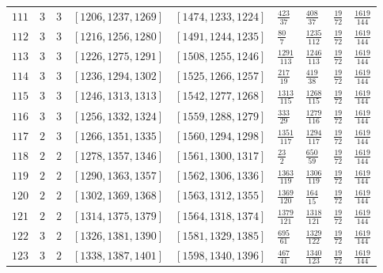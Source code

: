 \documentclass[12pt]{extarticle}
\begin{document}
\begin{longtable}{lllllllll}
$111$ & $3$ & $3$ & $\left[1206, 1237, 1269\right]$ & $\left[1474, 1233, 1224\right]$ & $\frac{423}{37}$ & $\frac{408}{37}$ & $\frac{19}{72}$ & $\frac{1619}{144}$ \\
$112$ & $3$ & $3$ & $\left[1216, 1256, 1280\right]$ & $\left[1491, 1244, 1235\right]$ & $\frac{80}{7}$ & $\frac{1235}{112}$ & $\frac{19}{72}$ & $\frac{1619}{144}$ \\
$113$ & $3$ & $3$ & $\left[1226, 1275, 1291\right]$ & $\left[1508, 1255, 1246\right]$ & $\frac{1291}{113}$ & $\frac{1246}{113}$ & $\frac{19}{72}$ & $\frac{1619}{144}$ \\
$114$ & $3$ & $3$ & $\left[1236, 1294, 1302\right]$ & $\left[1525, 1266, 1257\right]$ & $\frac{217}{19}$ & $\frac{419}{38}$ & $\frac{19}{72}$ & $\frac{1619}{144}$ \\
$115$ & $3$ & $3$ & $\left[1246, 1313, 1313\right]$ & $\left[1542, 1277, 1268\right]$ & $\frac{1313}{115}$ & $\frac{1268}{115}$ & $\frac{19}{72}$ & $\frac{1619}{144}$ \\
$116$ & $3$ & $3$ & $\left[1256, 1332, 1324\right]$ & $\left[1559, 1288, 1279\right]$ & $\frac{333}{29}$ & $\frac{1279}{116}$ & $\frac{19}{72}$ & $\frac{1619}{144}$ \\
$117$ & $2$ & $3$ & $\left[1266, 1351, 1335\right]$ & $\left[1560, 1294, 1298\right]$ & $\frac{1351}{117}$ & $\frac{1294}{117}$ & $\frac{19}{72}$ & $\frac{1619}{144}$ \\
$118$ & $2$ & $2$ & $\left[1278, 1357, 1346\right]$ & $\left[1561, 1300, 1317\right]$ & $\frac{23}{2}$ & $\frac{650}{59}$ & $\frac{19}{72}$ & $\frac{1619}{144}$ \\
$119$ & $2$ & $2$ & $\left[1290, 1363, 1357\right]$ & $\left[1562, 1306, 1336\right]$ & $\frac{1363}{119}$ & $\frac{1306}{119}$ & $\frac{19}{72}$ & $\frac{1619}{144}$ \\
$120$ & $2$ & $2$ & $\left[1302, 1369, 1368\right]$ & $\left[1563, 1312, 1355\right]$ & $\frac{1369}{120}$ & $\frac{164}{15}$ & $\frac{19}{72}$ & $\frac{1619}{144}$ \\
$121$ & $2$ & $2$ & $\left[1314, 1375, 1379\right]$ & $\left[1564, 1318, 1374\right]$ & $\frac{1379}{121}$ & $\frac{1318}{121}$ & $\frac{19}{72}$ & $\frac{1619}{144}$ \\
$122$ & $3$ & $2$ & $\left[1326, 1381, 1390\right]$ & $\left[1581, 1329, 1385\right]$ & $\frac{695}{61}$ & $\frac{1329}{122}$ & $\frac{19}{72}$ & $\frac{1619}{144}$ \\
$123$ & $3$ & $2$ & $\left[1338, 1387, 1401\right]$ & $\left[1598, 1340, 1396\right]$ & $\frac{467}{41}$ & $\frac{1340}{123}$ & $\frac{19}{72}$ & $\frac{1619}{144}$ \\

\end{longtable}
\end{document}
